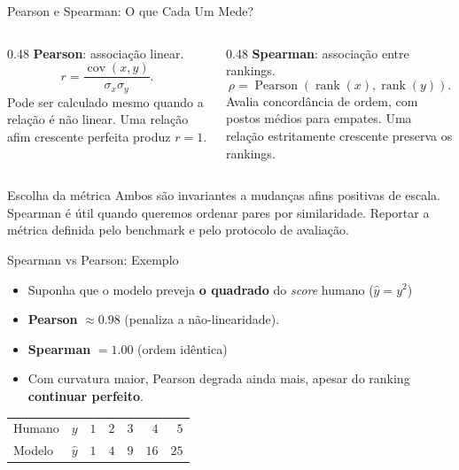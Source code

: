 \documentclass[aspectratio=169, xcolor=dvipsnames]{beamer}
\begin{document}
  \begin{frame}{Pearson e Spearman: O que Cada Um Mede?}
    \begin{columns}[T]
      \begin{column}{0.48\textwidth}
        \textbf{Pearson}: associação linear.
        \[
          r=\frac{\operatorname{cov}(x,y)}{\sigma_x\sigma_y}.
        \]
        Pode ser calculado mesmo quando a relação é não linear.
        Uma relação afim crescente perfeita produz $r=1$.
      \end{column}
      \begin{column}{0.48\textwidth}
        \textbf{Spearman}: associação entre rankings.
        \[
          \rho=\operatorname{Pearson}(\operatorname{rank}(x),\operatorname{rank}(y)).
        \]
        Avalia concordância de ordem, com postos médios para empates.
        Uma relação estritamente crescente preserva os rankings.
      \end{column}
    \end{columns}
    \begin{block}{Escolha da métrica}
      Ambos são invariantes a mudanças afins positivas de escala.
      Spearman é útil quando queremos ordenar pares por similaridade.
      Reportar a métrica definida pelo benchmark e pelo protocolo de avaliação.
    \end{block}
  \end{frame}
  \begin{frame}{Spearman vs Pearson: Exemplo}

  \begin{itemize}
      \item Suponha que o modelo preveja \textbf{o quadrado} do \textit{score} humano ($\hat{y} = y^2$)
      \item \textbf{Pearson} $\approx 0.98$ (penaliza a não-linearidade).
      \item \textbf{Spearman} $= 1.00$ (ordem idêntica) 
      \item Com curvatura maior, Pearson degrada ainda mais, apesar do ranking \textbf{continuar perfeito}.
      
  \end{itemize}
      
      \centering
      \begin{tabular}{lcrrrrr}
        \toprule
        Humano & $y$ & $1$ & $2$ & $3$ & $4$ & $5$ \\
        Modelo & $\hat{y}$ & $1$ & $4$ & $9$ & $16$ & $25$ \\
        \bottomrule
      \end{tabular}
      
            
\end{frame}
\end{document}
